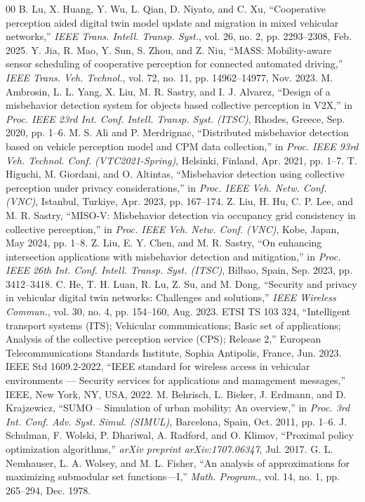 \documentclass[conference]{IEEEtran}
\begin{document}
\begin{thebibliography}{00}
 B. Lu, X. Huang, Y. Wu, L. Qian, D. Niyato, and C. Xu, ``Cooperative perception aided digital twin model update and migration in mixed vehicular networks,'' \textit{IEEE Trans. Intell. Transp. Syst.}, vol. 26, no. 2, pp. 2293--2308, Feb. 2025.
 Y. Jia, R. Mao, Y. Sun, S. Zhou, and Z. Niu, ``MASS: Mobility-aware sensor scheduling of cooperative perception for connected automated driving,'' \textit{IEEE Trans. Veh. Technol.}, vol. 72, no. 11, pp. 14962--14977, Nov. 2023.
 M. Ambrosin, L. L. Yang, X. Liu, M. R. Sastry, and I. J. Alvarez, ``Design of a misbehavior detection system for objects based collective perception in V2X,'' in \textit{Proc. IEEE 23rd Int. Conf. Intell. Transp. Syst. (ITSC)}, Rhodes, Greece, Sep. 2020, pp. 1--6.
 M. S. Ali and P. Merdrignac, ``Distributed misbehavior detection based on vehicle perception model and CPM data collection,'' in \textit{Proc. IEEE 93rd Veh. Technol. Conf. (VTC2021-Spring)}, Helsinki, Finland, Apr. 2021, pp. 1--7.
 T. Higuchi, M. Giordani, and O. Altintas, ``Misbehavior detection using collective perception under privacy considerations,'' in \textit{Proc. IEEE Veh. Netw. Conf. (VNC)}, Istanbul, Turkiye, Apr. 2023, pp. 167--174.
 Z. Liu, H. Hu, C. P. Lee, and M. R. Sastry, ``MISO-V: Misbehavior detection via occupancy grid consistency in collective perception,'' in \textit{Proc. IEEE Veh. Netw. Conf. (VNC)}, Kobe, Japan, May 2024, pp. 1--8.
 Z. Liu, E. Y. Chen, and M. R. Sastry, ``On enhancing intersection applications with misbehavior detection and mitigation,'' in \textit{Proc. IEEE 26th Int. Conf. Intell. Transp. Syst. (ITSC)}, Bilbao, Spain, Sep. 2023, pp. 3412--3418.
 C. He, T. H. Luan, R. Lu, Z. Su, and M. Dong, ``Security and privacy in vehicular digital twin networks: Challenges and solutions,'' \textit{IEEE Wireless Commun.}, vol. 30, no. 4, pp. 154--160, Aug. 2023.
 ETSI TS 103 324, ``Intelligent transport systems (ITS); Vehicular communications; Basic set of applications; Analysis of the collective perception service (CPS); Release 2,'' European Telecommunications Standards Institute, Sophia Antipolis, France, Jun. 2023.
 IEEE Std 1609.2-2022, ``IEEE standard for wireless access in vehicular environments --- Security services for applications and management messages,'' IEEE, New York, NY, USA, 2022.
 M. Behrisch, L. Bieker, J. Erdmann, and D. Krajzewicz, ``SUMO -- Simulation of urban mobility: An overview,'' in \textit{Proc. 3rd Int. Conf. Adv. Syst. Simul. (SIMUL)}, Barcelona, Spain, Oct. 2011, pp. 1--6.
 J. Schulman, F. Wolski, P. Dhariwal, A. Radford, and O. Klimov, ``Proximal policy optimization algorithms,'' \textit{arXiv preprint arXiv:1707.06347}, Jul. 2017.
 G. L. Nemhauser, L. A. Wolsey, and M. L. Fisher, ``An analysis of approximations for maximizing submodular set functions---I,'' \textit{Math. Program.}, vol. 14, no. 1, pp. 265--294, Dec. 1978.
\end{thebibliography}
\end{document}
